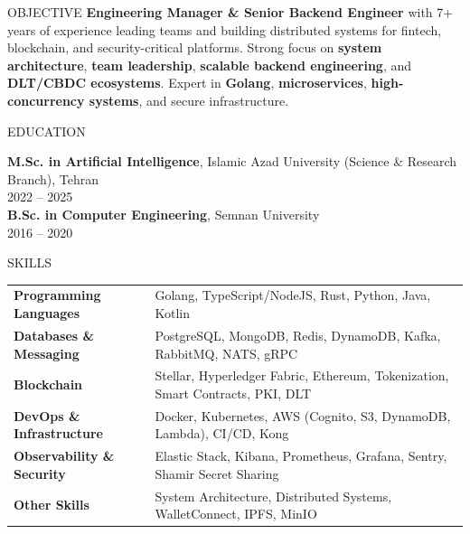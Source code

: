 \documentclass{resume}
\begin{document}

\begin{rSection}{OBJECTIVE}
\textbf{Engineering Manager \& Senior Backend Engineer} with 7+ years of experience leading teams and building distributed systems for fintech, blockchain, and security-critical platforms. Strong focus on \textbf{system architecture}, \textbf{team leadership}, \textbf{scalable backend engineering}, and \textbf{DLT/CBDC ecosystems}. 
Expert in \textbf{Golang}, \textbf{microservices}, \textbf{high-concurrency systems}, and secure infrastructure.
\end{rSection}


\begin{rSection}{EDUCATION}

\textbf{M.Sc. in Artificial Intelligence}, Islamic Azad University (Science \& Research Branch), Tehran \\
2022 -- 2025 \\
\textbf{B.Sc. in Computer Engineering}, Semnan University \\
2016 -- 2020

\end{rSection}


\begin{rSection}{SKILLS}

\begin{tabular}{ @{} >{\bfseries}l @{\hspace{6ex}} l }
Programming Languages & Golang, TypeScript/NodeJS, Rust, Python, Java, Kotlin \\
Databases \& Messaging & PostgreSQL, MongoDB, Redis, DynamoDB, Kafka, RabbitMQ, NATS, gRPC \\
Blockchain & Stellar, Hyperledger Fabric, Ethereum, Tokenization, Smart Contracts, PKI, DLT \\
DevOps \& Infrastructure & Docker, Kubernetes, AWS (Cognito, S3, DynamoDB, Lambda), CI/CD, Kong \\
Observability \& Security & Elastic Stack, Kibana, Prometheus, Grafana, Sentry, Shamir Secret Sharing \\
Other Skills & System Architecture, Distributed Systems, WalletConnect, IPFS, MinIO \\
\end{tabular}

\end{rSection}
\end{document}
